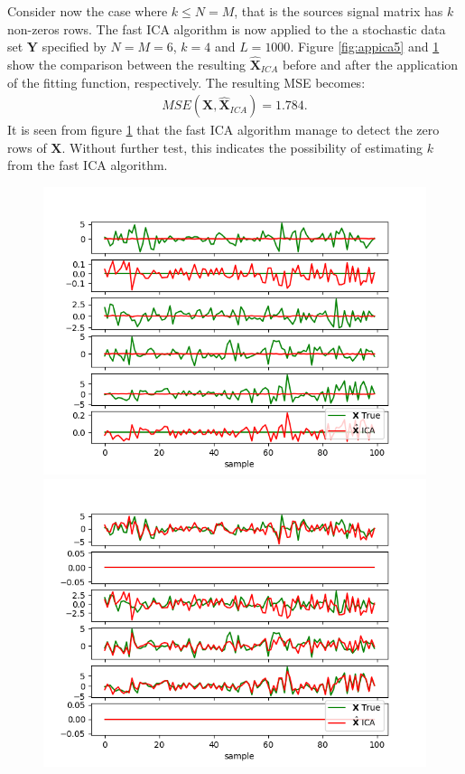 Consider now the case where $k \leq N=M$, that is the sources signal matrix has $k$ non-zeros rows. 
The fast ICA algorithm is now applied to the a stochastic data set $\textbf{Y} $ specified by $N=M=6$, $k = 4$ and $L=1000$. Figure \ref{fig:appica5} and \ref{fig:appica6} show the comparison between the resulting $\hat{\textbf{X}}_{ICA}$ before and after the application of the fitting function, respectively. The resulting MSE becomes:
\begin{align*}
MSE(\textbf{X},\hat{\textbf{X}}_{ICA}) = 1.784.
\end{align*} 
It is seen from figure \ref{fig:appica6} that the fast ICA algorithm manage to  detect the zero rows of $\textbf{X}$. Without further test, this indicates the possibility of estimating $k$ from the fast ICA algorithm. 
\begin{figure}[H]
    \begin{minipage}[t]{.45\textwidth}
		\centering
		\includegraphics[scale=0.5]{figures/ICAapp/ICA_app5.png}
	\caption{}
	\label{fig:appica5}
    \end{minipage} 
    \hfill
    \begin{minipage}[t]{.45\textwidth}
		\centering
		\includegraphics[scale=0.5]{figures/ICAapp/ICA_app6.png}
	\caption{}
	\label{fig:appica6}
    \end{minipage}
\end{figure}

